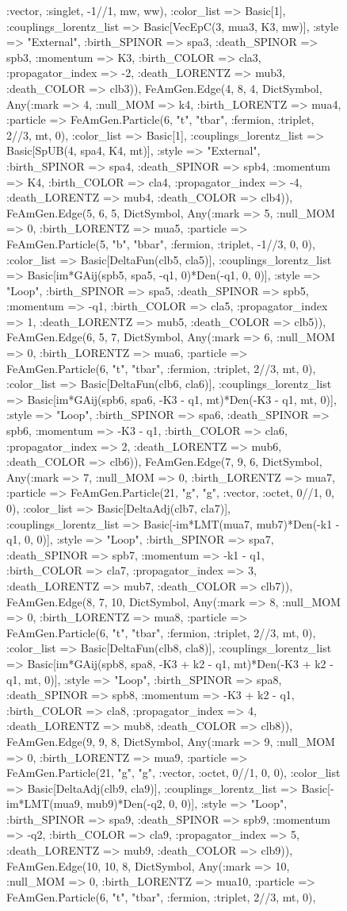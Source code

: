 \documentclass{revtex4}
\begin{document}
\begin{figure}[!htb]
\begin{center}
{:vector, :singlet, -1//1, mw, ww), :color_list => Basic[1], :couplings_lorentz_list => Basic[VecEpC(3, mua3, K3, mw)], :style => "External", :birth_SPINOR => spa3, :death_SPINOR => spb3, :momentum => K3, :birth_COLOR => cla3, :propagator_index => -2, :death_LORENTZ => mub3, :death_COLOR => clb3)), FeAmGen.Edge(4, 8, 4, Dict{Symbol, Any}(:mark => 4, :null_MOM => k4, :birth_LORENTZ => mua4, :particle => FeAmGen.Particle(6, "t", "tbar", :fermion, :triplet, 2//3, mt, 0), :color_list => Basic[1], :couplings_lorentz_list => Basic[SpUB(4, spa4, K4, mt)], :style => "External", :birth_SPINOR => spa4, :death_SPINOR => spb4, :momentum => K4, :birth_COLOR => cla4, :propagator_index => -4, :death_LORENTZ => mub4, :death_COLOR => clb4)), FeAmGen.Edge(5, 6, 5, Dict{Symbol, Any}(:mark => 5, :null_MOM => 0, :birth_LORENTZ => mua5, :particle => FeAmGen.Particle(5, "b", "bbar", :fermion, :triplet, -1//3, 0, 0), :color_list => Basic[DeltaFun(clb5, cla5)], :couplings_lorentz_list => Basic[im*GAij(spb5, spa5, -q1, 0)*Den(-q1, 0, 0)], :style => "Loop", :birth_SPINOR => spa5, :death_SPINOR => spb5, :momentum => -q1, :birth_COLOR => cla5, :propagator_index => 1, :death_LORENTZ => mub5, :death_COLOR => clb5)), FeAmGen.Edge(6, 5, 7, Dict{Symbol, Any}(:mark => 6, :null_MOM => 0, :birth_LORENTZ => mua6, :particle => FeAmGen.Particle(6, "t", "tbar", :fermion, :triplet, 2//3, mt, 0), :color_list => Basic[DeltaFun(clb6, cla6)], :couplings_lorentz_list => Basic[im*GAij(spb6, spa6, -K3 - q1, mt)*Den(-K3 - q1, mt, 0)], :style => "Loop", :birth_SPINOR => spa6, :death_SPINOR => spb6, :momentum => -K3 - q1, :birth_COLOR => cla6, :propagator_index => 2, :death_LORENTZ => mub6, :death_COLOR => clb6)), FeAmGen.Edge(7, 9, 6, Dict{Symbol, Any}(:mark => 7, :null_MOM => 0, :birth_LORENTZ => mua7, :particle => FeAmGen.Particle(21, "g", "g", :vector, :octet, 0//1, 0, 0), :color_list => Basic[DeltaAdj(clb7, cla7)], :couplings_lorentz_list => Basic[-im*LMT(mua7, mub7)*Den(-k1 - q1, 0, 0)], :style => "Loop", :birth_SPINOR => spa7, :death_SPINOR => spb7, :momentum => -k1 - q1, :birth_COLOR => cla7, :propagator_index => 3, :death_LORENTZ => mub7, :death_COLOR => clb7)), FeAmGen.Edge(8, 7, 10, Dict{Symbol, Any}(:mark => 8, :null_MOM => 0, :birth_LORENTZ => mua8, :particle => FeAmGen.Particle(6, "t", "tbar", :fermion, :triplet, 2//3, mt, 0), :color_list => Basic[DeltaFun(clb8, cla8)], :couplings_lorentz_list => Basic[im*GAij(spb8, spa8, -K3 + k2 - q1, mt)*Den(-K3 + k2 - q1, mt, 0)], :style => "Loop", :birth_SPINOR => spa8, :death_SPINOR => spb8, :momentum => -K3 + k2 - q1, :birth_COLOR => cla8, :propagator_index => 4, :death_LORENTZ => mub8, :death_COLOR => clb8)), FeAmGen.Edge(9, 9, 8, Dict{Symbol, Any}(:mark => 9, :null_MOM => 0, :birth_LORENTZ => mua9, :particle => FeAmGen.Particle(21, "g", "g", :vector, :octet, 0//1, 0, 0), :color_list => Basic[DeltaAdj(clb9, cla9)], :couplings_lorentz_list => Basic[-im*LMT(mua9, mub9)*Den(-q2, 0, 0)], :style => "Loop", :birth_SPINOR => spa9, :death_SPINOR => spb9, :momentum => -q2, :birth_COLOR => cla9, :propagator_index => 5, :death_LORENTZ => mub9, :death_COLOR => clb9)), FeAmGen.Edge(10, 10, 8, Dict{Symbol, Any}(:mark => 10, :null_MOM => 0, :birth_LORENTZ => mua10, :particle => FeAmGen.Particle(6, "t", "tbar", :fermion, :triplet, 2//3, mt, 0), }
\end{center}
\end{figure}
\end{document}
